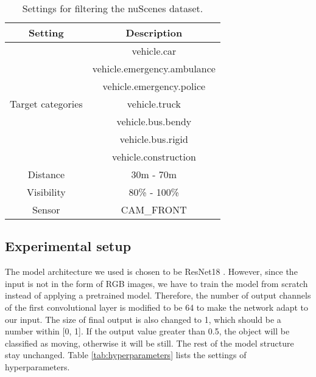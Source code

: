 \documentclass[10pt, a4paper, twocolumn]{article}
\begin{document}
    \begin{table}[t!]
    \centering
    \caption{Settings for filtering the nuScenes dataset.}
    \label{tab:dataset_setting}
    \begin{tabular}{c c}
        \hline
         Setting & Description \\
        \hline\hline    
        \multirow{7}{7.5em}{\centering Target categories} & vehicle.car \\ & vehicle.emergency.ambulance \\ & vehicle.emergency.police \\
        & vehicle.truck \\ & vehicle.bus.bendy \\ & vehicle.bus.rigid \\ & vehicle.construction \\
        \hline
        Distance & 30m - 70m \\
        \hline
        Visibility & 80\% - 100\% \\
        \hline
        Sensor & CAM\_FRONT \\
        \hline
    \end{tabular}
    \end{table}
   
\subsection{\normalsize Experimental setup}

    The model architecture we used is chosen to be ResNet18 \cite{DBLP:journals/corr/HeZRS15}. However, since the input is not in the form of RGB images, we have to train the model from scratch instead of applying a pretrained model. Therefore, the number of output channels of the first convolutional layer is modified to be 64 to make the network adapt to our input. The size of final output is also changed to 1, which should be a number within [0, 1]. If the output value greater than 0.5, the object will be classified as moving, otherwise it will be still. The rest of the model structure stay unchanged. Table \ref{tab:hyperparameters} lists the settings of hyperparameters.
    
\end{document}
